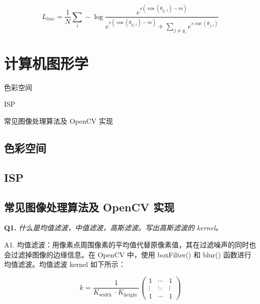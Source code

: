\documentclass[cn,10pt,math=newtx,citestyle=gb7714-2015,bibstyle=gb7714-2015]{elegantbook}
\begin{document}
\begin{equation}
L_{l m c}=\frac{1}{N} \sum_{i}-\log \frac{e^{s\left(\cos \left(\theta_{y_{i}, i}\right)-m\right)}}{e^{s\left(\cos \left(\theta_{y_{i}, i}\right)-m\right)}+\sum_{j \neq y_{i}} e^{s \cos \left(\theta_{j, i}\right)}}
\end{equation}









\newpage


\section{计算机图形学}

\begin{introduction}
\item 色彩空间
\item ISP
\item 常见图像处理算法及 OpenCV 实现
\end{introduction}

\subsection{色彩空间}

\subsection{ISP}

\subsection{常见图像处理算法及 OpenCV 实现}

\textbf{Q1.} \textit{什么是均值滤波，中值滤波，高斯滤波。写出高斯滤波的 kernel。}

A1. 均值滤波：用像素点周围像素的平均值代替原像素值，其在过滤噪声的同时也会过滤掉图像的边缘信息。在 OpenCV 中，使用 boxFilter() 和 blur() 函数进行均值滤波。均值滤波 kernel 如下所示：

\begin{equation}
k=\frac{1}{K_{\text {width }} \cdot K_{\text {height }}}\left(\begin{array}{ccc}
1 & \cdots & 1 \\
\vdots & \ddots & \vdots \\
1 & \cdots & 1
\end{array}\right)
\end{equation}
\end{document}
